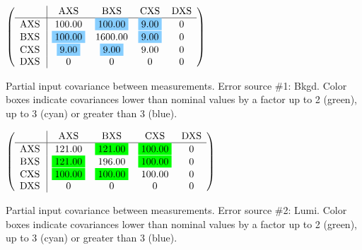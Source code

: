 \begin{table}[H]
\scriptsize
\begin{center}
\renewcommand{\arraystretch}{1.1}
\begin{math}\left(\begin{array}{c|cccc}
 & \mathrm{AXS} & 
\mathrm{BXS} & 
\mathrm{CXS} & 
\mathrm{DXS} \\
\hline
\mathrm{AXS} \hspace*{2pt} &     100.00 &  \colorbox{SkyBlue1}{$    100.00$} &  \colorbox{SkyBlue1}{$      9.00$} &  0 \\
\mathrm{BXS} \hspace*{2pt} &  \colorbox{SkyBlue1}{$    100.00$} &    1600.00 &  \colorbox{SkyBlue1}{$      9.00$} &  0 \\
\mathrm{CXS} \hspace*{2pt} &  \colorbox{SkyBlue1}{$      9.00$} &  \colorbox{SkyBlue1}{$      9.00$} &       9.00 &  0 \\
\mathrm{DXS} \hspace*{2pt} &  0 &  0 &  0 &  0 \\
\end{array}\right)\end{math}
\caption{Partial input covariance between measurements. Error source \#1: Bkgd. Color boxes indicate covariances lower than nominal values by a factor up to 2 (green), up to 3 (cyan) or greater than 3 (blue).}
\renewcommand{\arraystretch}{1}
\end{center}
\end{table}
\begin{table}[H]
\scriptsize
\begin{center}
\renewcommand{\arraystretch}{1.1}
\begin{math}\left(\begin{array}{c|cccc}
 & \mathrm{AXS} & 
\mathrm{BXS} & 
\mathrm{CXS} & 
\mathrm{DXS} \\
\hline
\mathrm{AXS} \hspace*{2pt} &     121.00 &  \colorbox{Green1}{$    121.00$} &  \colorbox{Green1}{$    100.00$} &  0 \\
\mathrm{BXS} \hspace*{2pt} &  \colorbox{Green1}{$    121.00$} &     196.00 &  \colorbox{Green1}{$    100.00$} &  0 \\
\mathrm{CXS} \hspace*{2pt} &  \colorbox{Green1}{$    100.00$} &  \colorbox{Green1}{$    100.00$} &     100.00 &  0 \\
\mathrm{DXS} \hspace*{2pt} &  0 &  0 &  0 &  0 \\
\end{array}\right)\end{math}
\caption{Partial input covariance between measurements. Error source \#2: Lumi. Color boxes indicate covariances lower than nominal values by a factor up to 2 (green), up to 3 (cyan) or greater than 3 (blue).}
\renewcommand{\arraystretch}{1}
\end{center}
\end{table}
\clearpage
